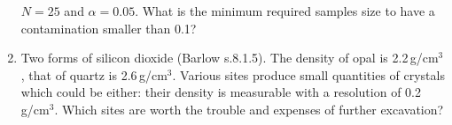\documentclass[a4paper,12pt]{article}
\begin{document}
\begin{enumerate}
   $N=25$ and $\alpha=0.05$. What is the minimum required samples size to have a contamination smaller than 0.1?
   \item Two forms of silicon dioxide (Barlow s.8.1.5). The density of opal is 2.2\,g/cm$^3$, that of quartz is 2.6\,g/cm$^3$. Various sites produce small quantities of crystals which 
   could be either: their density is measurable with a resolution of 0.2\,g/cm$^3$. Which sites are worth the trouble and expenses of further excavation?
 \end{enumerate}
\end{document}

